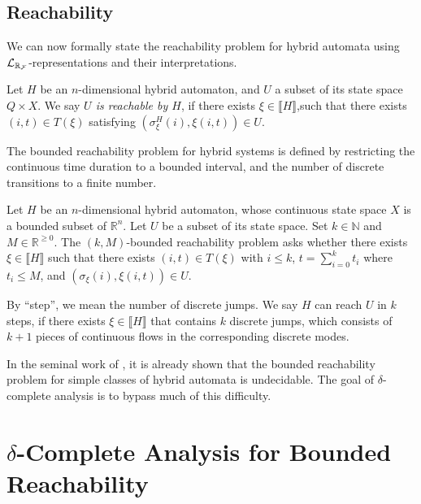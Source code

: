 \documentclass[12pt]{llncs}
\newtheorem{notation}[theorem]{Notation}
\begin{document}
\subsection{Reachability}
We can now formally state the reachability problem for hybrid automata using $\mathcal{L}_{\mathbb{R}_{\mathcal{F}}}$-representations and their interpretations.
\begin{definition}[Reachability]\label{reachability}
Let $H$ be an $n$-dimensional hybrid automaton, and $U$ a subset of its state
space $Q\times X$.  We say {\em $U$ is reachable by $H$}, if there exists
$\xi\in\llbracket
H \rrbracket$,such that there exists $(i,t)\in T(\xi)$ satisfying
$(\sigma^H_{\xi}(i), \xi(i,t))\in U.$
\end{definition}
The bounded reachability problem for hybrid systems is defined by restricting
the continuous time duration to a bounded interval, and the number
of discrete transitions to a finite number.
\begin{definition}
Let $H$ be an $n$-dimensional hybrid automaton, whose continuous state space
$X$ is a bounded subset of $\mathbb{R}^n$. Let $U$ be a subset of its state
space. Set $k\in \mathbb{N}$ and $M \in \mathbb{R}^{\geq 0}$. The {$(k,M)$-bounded
reachability problem} asks whether there exists
$\xi\in\llbracket H \rrbracket$ such that there exists $(i,t)\in T(\xi)$ with $i\leq k$, $t=
\sum_{i=0}^k t_i$ where $t_i \leq M$, and $(\sigma_{\xi}(i), \xi(i,t))\in U.$
\end{definition}
\begin{remark}
By ``step'', we mean the number of discrete jumps. We say $H$ can reach $U$ in $k$ steps, if there exists $\xi\in\llbracket H\rrbracket$ that contains $k$ discrete jumps, which consists of $k+1$ pieces of continuous flows in the corresponding discrete modes.
\end{remark}

In the seminal work of \cite{DBLP:conf/rex/AlurD91,DBLP:conf/hybrid/AlurCHH92}, it is already shown that the bounded reachability problem for simple classes of hybrid automata is undecidable. The goal of $\delta$-complete analysis is to bypass much of this difficulty.

\section{$\delta$-Complete Analysis for Bounded Reachability}\label{main}
\end{document}
